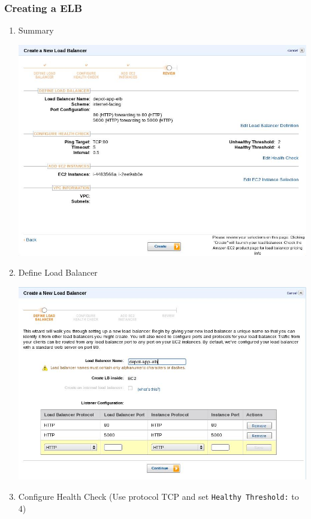 \documentclass{beamer}
\begin{document}
\begin{frame}
\frametitle{Creating a ELB}
\begin{enumerate}	
\item Summary
\begin{center}
\includegraphics[scale=0.2]{createelb3.jpg}
\end{center}
\item Define Load Balancer
\begin{center}
\includegraphics[scale=0.2]{define-load-balancer.jpg}
\end{center}	
\item Configure Health Check (\alert{Use protocol TCP and set \texttt{Healthy Threshold:} to 4})
\begin{center}

\end{center}
\end{enumerate}
\end{frame}
\end{document}
